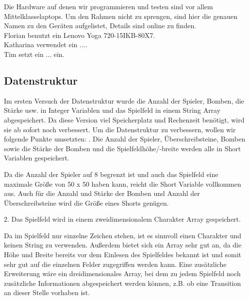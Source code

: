 \documentclass[12pt,a4paper,bibliography=totocnumbered,listof=totocnumbered]{scrartcl}
\begin{document}
    Die Hardware auf denen wir programmieren und testen sind vor allem \glqq Mittelklasselaptops\grqq. Um den Rahmen nicht zu sprengen, sind hier die genauen Namen zu den Geräten aufgelistet, Details sind online zu finden.\\
    Florian benutzt ein Lenovo Yoga 720-15IKB-80X7.\footnotemark\\
    Katharina verwendet ein ....\\ %
    Tim setzt ein ... ein.\\ %
	
	


    \subsection{Datenstruktur}
    \vspace{1em}
    Im ersten Versuch der Datenstruktur wurde die Anzahl der Spieler, Bomben, die Stärke usw. in Integer Variablen und das Spielfeld in einem String Array abgespeichert. Da diese Version viel Speicherplatz und Rechenzeit benötigt, wird sie ab sofort noch verbessert.
    Um die Datenstruktur zu verbessern, wollen wir folgende Punkte umsetzten:
    . Die Anzahl der Spieler, Überschreibsteine, Bomben sowie die Stärke der Bomben und die Spielfeldhöhe/-breite werden alle in Short Variablen gespeichert.

    Da die Anzahl der Spieler auf 8 begrenzt ist und auch das Spielfeld eine maximale Größe von 50 x 50 haben kann, reicht die Short Variable vollkommen aus. Auch für die Anzahl und Stärke der Bomben und Anzahl der Überschreibsteine wird die Größe eines Shorts genügen.

    2. Das Spielfeld wird in einem zweidimensionalem Charakter Array gespeichert.

    Da im Spielfeld nur einzelne Zeichen stehen, ist es sinnvoll einen Charakter und keinen String zu verwenden. Außerdem bietet sich ein Array sehr gut an, da die Höhe und Breite bereits vor dem Einlesen des Spielfeldes bekannt ist und somit sehr gut auf die einzelnen Felder zugegriffen werden kann.
    Eine zusätzliche Erweiterung wäre ein dreidimensionales Array, bei dem zu jedem Spielfeld noch zusätzliche Informationen abgespeichert werden können, z.B. ob eine Transition an dieser Stelle vorhaben ist.
\end{document}
